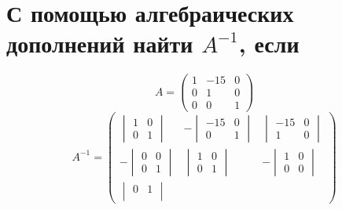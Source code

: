 \documentclass[12pt]{article}
\begin{document}
\begin{sloppypar}

    \section{С помощью алгебраических дополнений найти $A^{-1}$, если}
    \[
        A = \begin{pmatrix}
            1 & -15 & 0 \\
            0 & 1   & 0 \\
            0 & 0   & 1
        \end{pmatrix}
    \]
    \[
        A^{-1} =
        \begin{pmatrix}
            \begin{vmatrix}
                1 & 0 \\
                0 & 1
            \end{vmatrix}
             &
            -\begin{vmatrix}
                 -15 & 0 \\
                 0   & 1
             \end{vmatrix}
             &
            \begin{vmatrix}
                -15 & 0 \\
                1   & 0
            \end{vmatrix}
            \\
            -\begin{vmatrix}
                 0 & 0 \\
                 0 & 1
             \end{vmatrix}
             &
            \begin{vmatrix}
                1 & 0 \\
                0 & 1
            \end{vmatrix}
             &
            -\begin{vmatrix}
                 1 & 0 \\
                 0 & 0
             \end{vmatrix}
            \\
            \begin{vmatrix}
                0 & 1 \\

\end{vmatrix}
\end{pmatrix}\]
\end{sloppypar}
\end{document}
